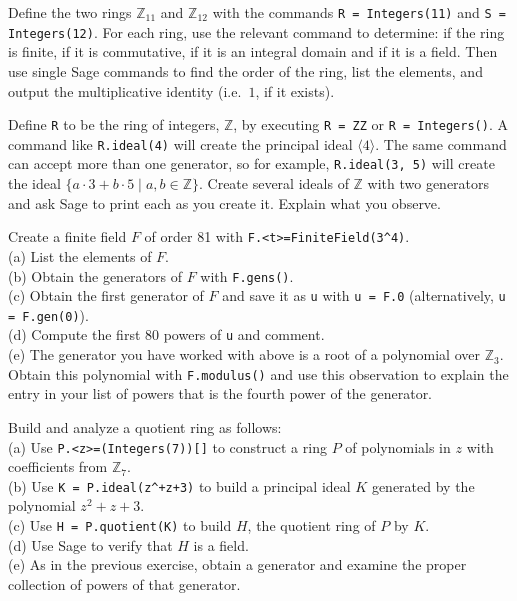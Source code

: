 \begin{sageverbatim}\end{sageverbatim}
%
%
Define the two rings ${\mathbb Z}_{11}$ and ${\mathbb Z}_{12}$ with the commands \verb?R = Integers(11)? and \verb?S = Integers(12)?.  For each ring, use the relevant command to determine:  if the ring is finite, if it is commutative, if it is an integral domain and if it is a field.  Then use single Sage commands to find the order of the ring, list the elements, and output the multiplicative identity (i.e.\ $1$, if it exists).
\begin{sageverbatim}\end{sageverbatim}
%
%
Define \verb?R? to be the ring of integers, ${\mathbb Z}$, by executing \verb?R = ZZ? or \verb?R = Integers()?.  A command like \verb?R.ideal(4)? will create the principal ideal $\langle 4\rangle$.  The same command can accept more than one generator, so for example, \verb?R.ideal(3, 5)? will create the ideal $\{a\cdot 3+ b\cdot 5\mid a,b\in{\mathbb Z}\}$.  Create several ideals of ${\mathbb Z}$ with two generators and ask Sage to print each as you create it.  Explain what you observe.
\begin{sageverbatim}\end{sageverbatim}
%
%
Create a finite field $F$ of order 81 with \verb?F.<t>=FiniteField(3^4)?.\\
(a) List the elements of $F$. \\
(b) Obtain the generators of $F$ with \verb?F.gens()?. \\
(c) Obtain the first generator of $F$ and save it as \verb?u? with \verb?u = F.0? (alternatively, \verb?u = F.gen(0)?). \\
(d) Compute the first 80 powers of \verb?u? and comment. \\
(e) The generator you have worked with above is a root of a polynomial over ${\mathbb Z}_3$.  Obtain this polynomial with \verb?F.modulus()? and use this observation to explain the entry in your list of powers that is the fourth power of the generator.
\begin{sageverbatim}\end{sageverbatim}
%
%
Build and analyze a quotient ring as follows:\\
(a) Use \verb?P.<z>=(Integers(7))[]? to construct a ring $P$ of polynomials in $z$ with coefficients from ${\mathbb Z}_7$.\\
(b) Use \verb?K = P.ideal(z^+z+3)? to build a principal ideal $K$ generated by the polynomial $z^2+z+3$.\\
(c) Use \verb?H = P.quotient(K)? to build $H$, the quotient ring of $P$ by $K$.\\
(d) Use Sage to verify that $H$ is a field. \\
(e) As in the previous exercise, obtain a generator and examine the proper collection of powers of that generator.
\begin{sageverbatim}\end{sageverbatim}
